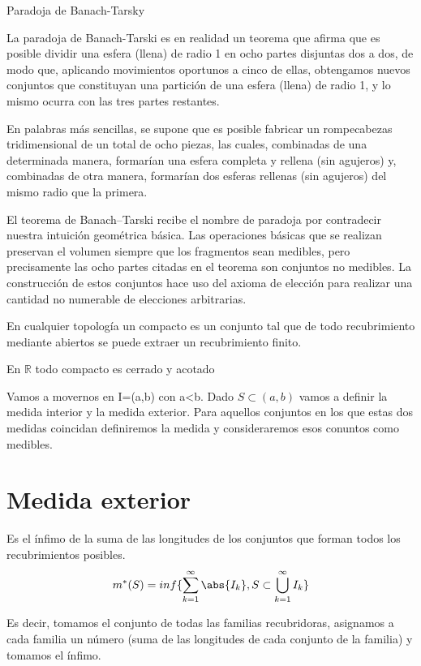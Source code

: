 \documentclass{apuntes}
\begin{document}
\begin{example}
Paradoja de Banach-Tarsky

La paradoja de Banach-Tarski es en realidad un teorema que afirma que es posible dividir una esfera (llena) de radio 1 en ocho partes disjuntas dos a dos, de modo que, aplicando movimientos oportunos a cinco de ellas, obtengamos nuevos conjuntos que constituyan una partición de una esfera (llena) de radio 1, y lo mismo ocurra con las tres partes restantes.

En palabras más sencillas, se supone que es posible fabricar un rompecabezas tridimensional de un total de ocho piezas, las cuales, combinadas de una determinada manera, formarían una esfera completa y rellena (sin agujeros) y, combinadas de otra manera, formarían dos esferas rellenas (sin agujeros) del mismo radio que la primera.

El teorema de Banach–Tarski recibe el nombre de paradoja por contradecir nuestra intuición geométrica básica. Las operaciones básicas que se realizan preservan el volumen siempre que los fragmentos sean medibles, pero precisamente las ocho partes citadas en el teorema son conjuntos no medibles. La construcción de estos conjuntos hace uso del axioma de elección para realizar una cantidad no numerable de elecciones arbitrarias.

\end{example}

\begin{defn}[Compacto]
En cualquier topología un compacto es un conjunto tal que de todo recubrimiento mediante abiertos se puede extraer un recubrimiento finito.
\end{defn}

\begin{theorem}
En $\mathbb{R}$ todo compacto es cerrado y acotado
\end{theorem}

Vamos  a movernos en I=(a,b) con a<b. Dado $S \subset (a,b)$  vamos a definir la medida interior y la medida exterior. Para aquellos conjuntos en los que estas dos medidas coincidan definiremos la medida y consideraremos esos conuntos como medibles.

\section{Medida exterior}
\begin{defn} Es el ínfimo de la suma de las longitudes de los conjuntos que forman todos los recubrimientos posibles.
\[m^*(S) = inf \lbrace \sum_{k=1}^{\infty} \abs{I_k}, S\subset \bigcup_{k=1}^{\infty} I_k \rbrace\]

Es decir, tomamos el conjunto de todas las familias recubridoras, asignamos a cada familia un número (suma de las longitudes de cada conjunto de la familia) y tomamos el ínfimo.
\end{defn}
\end{document}
